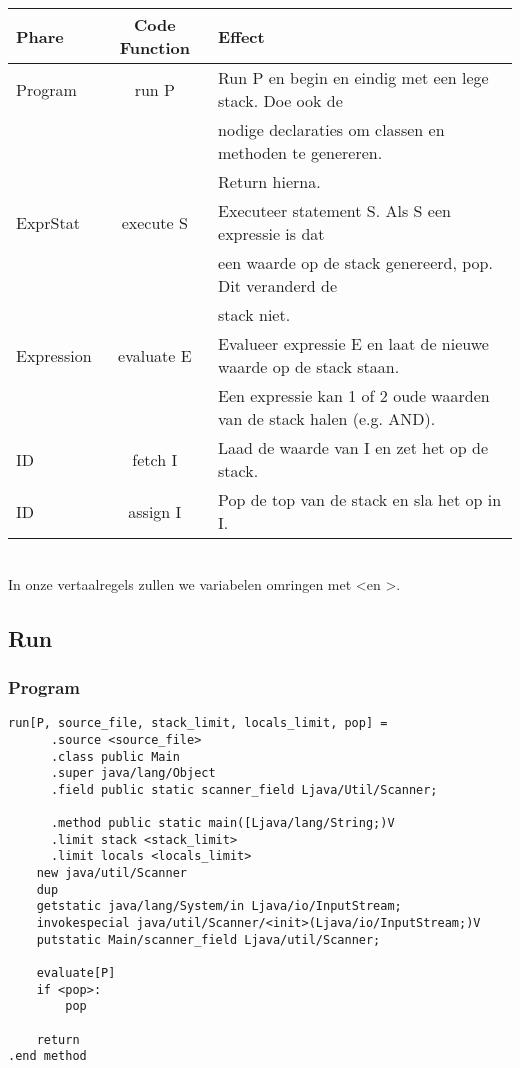 \documentclass[]{article}
\begin{document}
\begin{tabular}{| l | c | l |}
	Phare   & Code Function & Effect \\ 
	\hline \hline
  Program & run P       & Run P en begin en eindig met een lege stack. Doe ook de \\
  &&                      nodige declaraties om classen en methoden te genereren. \\
  &&											 Return hierna.\\ 
  \hline
  ExprStat & execute S  & Executeer statement S. Als S een expressie is dat \\
  && 										 een waarde op de stack genereerd, pop. Dit veranderd de \\
  &&											 stack niet. \\ 
  \hline
  Expression & evaluate E & Evalueer expressie E en laat de nieuwe waarde op de stack staan.\\
  &&												 Een expressie kan 1 of 2 oude waarden van de stack halen (e.g. AND). \\ 
  \hline
  ID				   & fetch I    & Laad de waarde van I en zet het op de stack. \\
  \hline
  ID					 & assign I   & Pop de top van de stack en sla het op in I. \\
  \hline
\end{tabular}
\\
In onze vertaalregels zullen we variabelen omringen met \textless en \textgreater.

\subsection{Run}
\subsubsection{Program}

\begin{verbatim}
run[P, source_file, stack_limit, locals_limit, pop] = 
	  .source <source_file>
	  .class public Main
	  .super java/lang/Object
	  .field public static scanner_field Ljava/Util/Scanner;
	  
	  .method public static main([Ljava/lang/String;)V
	  .limit stack <stack_limit>
	  .limit locals <locals_limit>
    new java/util/Scanner
    dup
    getstatic java/lang/System/in Ljava/io/InputStream;
    invokespecial java/util/Scanner/<init>(Ljava/io/InputStream;)V
    putstatic Main/scanner_field Ljava/util/Scanner;

    evaluate[P]
    if <pop>:
        pop

    return
.end method
\end{verbatim}
\end{document}
